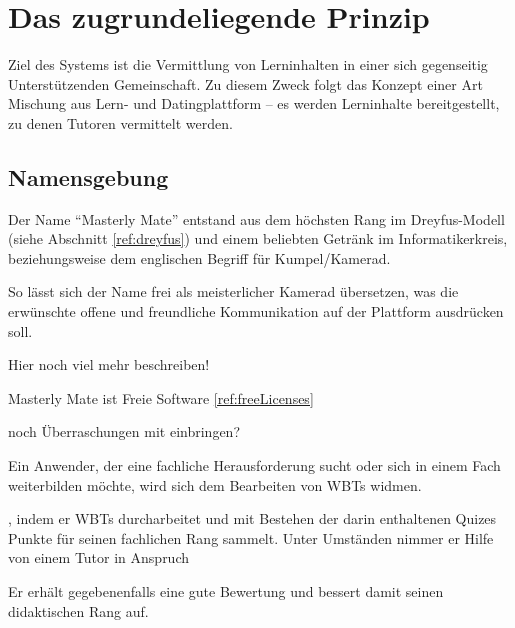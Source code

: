 

\chapter{Das zugrundeliegende Prinzip}
Ziel des Systems ist die Vermittlung von Lerninhalten in einer sich gegenseitig
Unterstützenden Gemeinschaft. Zu diesem Zweck folgt das Konzept einer Art
Mischung aus Lern- und Datingplattform -- es werden Lerninhalte bereitgestellt,
zu denen Tutoren vermittelt werden.

\section{Namensgebung}\label{ref:naming}
Der Name "`Masterly Mate"' entstand aus dem höchsten Rang im Dreyfus-Modell
(siehe Abschnitt \ref{ref:dreyfus}) und einem beliebten Getränk im
Informatikerkreis, beziehungsweise dem englischen Begriff für Kumpel/Kamerad.

So lässt sich der Name frei als meisterlicher Kamerad übersetzen, was die
erwünschte offene und freundliche Kommunikation auf der Plattform ausdrücken
soll.

\begin{k}
Hier noch viel mehr beschreiben!

Masterly Mate ist Freie Software\label{ref:freeLicensesConcept}
\ref{ref:freeLicenses}

noch Überraschungen mit einbringen? \cite{korte:2009}

Ein Anwender, der eine fachliche Herausforderung sucht oder sich in einem Fach
weiterbilden möchte, wird sich dem Bearbeiten von WBTs widmen.


, indem er WBTs durcharbeitet und mit Bestehen
der darin enthaltenen Quizes Punkte für seinen fachlichen Rang sammelt. Unter
Umständen nimmer er Hilfe von einem Tutor in Anspruch

Er erhält gegebenenfalls eine gute Bewertung und
bessert damit seinen didaktischen Rang auf.
\end{k}